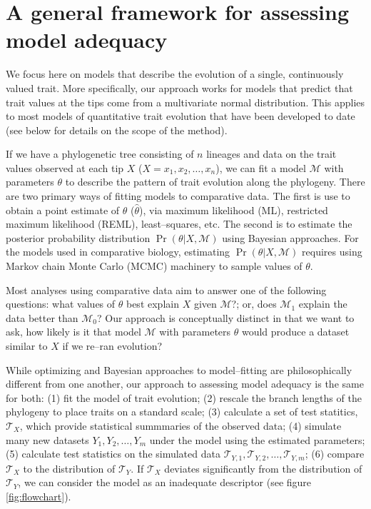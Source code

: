 \documentclass[a4paper,11pt]{article}
\begin{document}
\section{A general framework for assessing model adequacy}

We focus here on models that describe the evolution of a single, continuously valued trait. More specifically, our approach works for models that predict that trait values at the tips come from a multivariate normal distribution. This applies to most models of quantitative trait evolution that have been developed to date (see below for details on the scope of the method).

If we have a phylogenetic tree consisting of $n$ lineages and data on the trait values observed at each tip $X$ ($X=x_1, x_2, \ldots, x_n$), we can fit a model $\mathcal{M}$ with parameters $\theta$ to describe the pattern of trait evolution along the phylogeny. There are two primary ways of fitting models to comparative data. The first is use to obtain a point estimate of $\theta$ ($\hat \theta$), via maximum likelihood (ML), restricted maximum likelihood (REML), least--squares, etc. The second is to estimate the posterior probability distribution $\Pr(\theta|X, \mathcal{M})$ using Bayesian approaches.
For the models used in comparative biology, estimating $\Pr(\theta|X, \mathcal{M})$ requires using Markov chain Monte Carlo (MCMC) machinery to sample values of $\theta$.

Most analyses using comparative data aim to answer one of the following questions: what values of $\theta$ best explain $X$ given $\mathcal{M}$?; or, does $\mathcal{M}_1$ explain the data better than $\mathcal{M}_0$? 
Our approach is conceptually distinct in that we want to ask, how likely is it that model $\mathcal{M}$ with parameters $\theta$ would produce a dataset similar to $X$ if we re--ran evolution?   

While optimizing and Bayesian approaches to model--fitting are philosophically different from one another, our approach to assessing model adequacy is the same for both: (1) fit the model of trait evolution; (2) rescale the branch lengths of the phylogeny to place traits on a standard scale; (3) calculate a set of test statitics, $\mathcal{T}_X$, which provide statistical summmaries of the observed data; (4) simulate many new datasets $Y_1, Y_2, \ldots, Y_m$ under the model using the estimated parameters; (5) calculate test statistics on the simulated data $\mathcal{T}_{Y,1}, \mathcal{T}_{Y,2}, \ldots, \mathcal{T}_{Y,m}$; (6) compare $\mathcal{T}_X$ to the distribution of $\mathcal{T}_Y$. If $\mathcal{T}_X$ deviates significantly from the distribution of $\mathcal{T}_Y$, we can consider the model as an inadequate descriptor (see figure \ref{fig:flowchart}).
\end{document}
